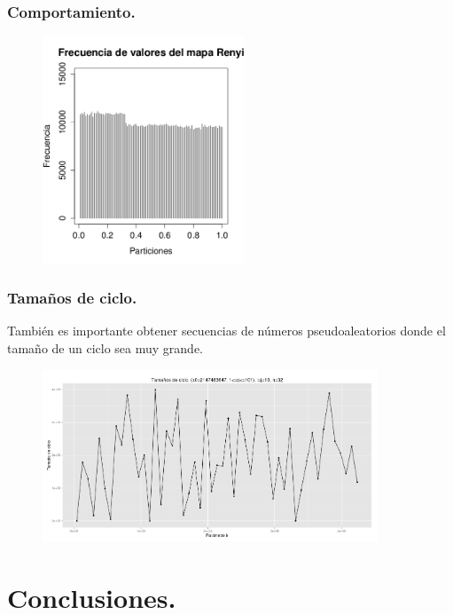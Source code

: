 \documentclass[xcolor=table]{beamer}
\begin{document}
\begin{frame}
\frametitle{Comportamiento.}
\begin{figure}[H]
\centering
\includegraphics[width=6cm]{pit.jpg}
\end{figure}
\end{frame}




\begin{frame}
\frametitle{Tamaños de ciclo.}
También es importante obtener secuencias de números pseudoaleatorios donde el tamaño de un ciclo sea muy grande.
\begin{figure}[H]
\centering
\includegraphics[width=10cm]{jaja.png}
\end{figure}
\end{frame}



\section{Conclusiones.}
\end{document}

